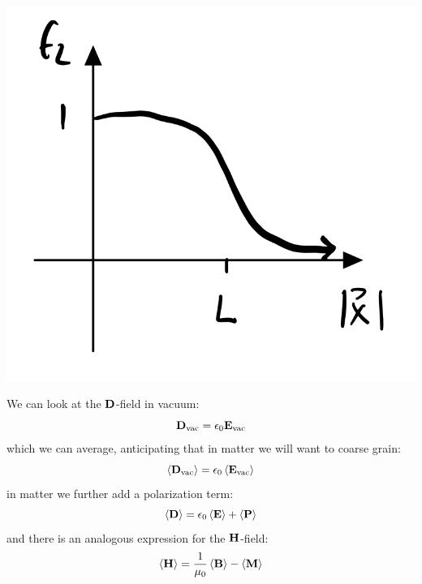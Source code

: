 \begin{center}
    \includegraphics[scale=0.35]{Lectures/Images/lec12-fL.png}
\end{center}

We can look at the $\mathbf{D}$-field in vacuum:
\begin{equation}
    \mathbf{D}_{\text{vac}} = \epsilon_0\mathbf{E}_{\text{vac}}
\end{equation}
which we can average, anticipating that in matter we will want to coarse grain:
\begin{equation}
    \left< \mathbf{D}_{\text{vac}} \right> = \epsilon_0\left< \mathbf{E}_{\text{vac}} \right>
\end{equation}
in matter we further add a polarization term:
\begin{equation}
    \left< \mathbf{D} \right> = \epsilon_0\left< \mathbf{E} \right> + \left< \mathbf{P} \right>
\end{equation}
and there is an analogous expression for the $\mathbf{H}$-field:
\begin{equation}
    \left< \mathbf{H} \right> = \frac{1}{\mu_0}\left< \mathbf{B} \right> - \left< \mathbf{M} \right>
\end{equation}

